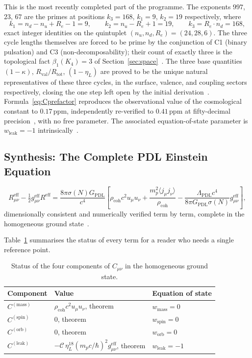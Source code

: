 \documentclass[11pt,a4paper]{article}
\newcommand{\Kfour}{K_4}
\newcommand{\Rtot}{R_{\mathrm{tot}}}
\newcommand{\Rval}{R_{\mathrm{val}}}
\newcommand{\Reb}{R_e}
\newcommand{\kap}{\kappa}
\newcommand{\etaL}{\eta_L}
\newcommand{\rhocoh}{\rho_{\mathrm{coh}}}
\newcommand{\Ccoh}{C_{\mu\nu}}
\newcommand{\Cmass}{C^{(\mathrm{mass})}}
\newcommand{\Cspin}{C^{(\mathrm{spin})}}
\newcommand{\Corb}{C^{(\mathrm{orb})}}
\newcommand{\Cleak}{C^{(\mathrm{leak})}}
\newcommand{\GPDL}{G_{\mathrm{PDL}}}
\newcommand{\LambdaPDL}{\Lambda_{\mathrm{PDL}}}
\newcommand{\geff}{g_{\mu\nu}^{\mathrm{eff}}}
\begin{document}
This is the most recently completed part of the programme. The exponents $997$, $23$, $67$ are the primes at positions $k_3=168$, $k_1=9$, $k_2=19$ respectively, where
\begin{equation}
k_1 = n_d - n_u + \Reb - 1 = 9,\qquad k_2 = n_u - \Reb + 1 = 19,\qquad k_3 = \Reb\cdot n_d = 168,
\label{eq:kindices}
\end{equation}
exact integer identities on the quintuplet $(n_u,n_d,\Reb)=(24,28,6)$. The three cycle lengths themselves are forced to be prime by the conjunction of C1 (binary pulsation) and C3 (non-decomposability); their count of exactly three is the topological fact $\beta_1(\Kfour)=3$ of Section~\ref{sec:space}~\citep{D51}. The three base quantities $(1-\kap)$, $\Rval/\Rtot$, $(1-\etaL)$ are proved to be the unique natural representatives of these three cycles, in the surface, valence, and coupling sectors respectively, closing the one step left open by the initial derivation~\citep{D52}. Formula~\eqref{eq:Cprefactor} reproduces the observational value of the cosmological constant to $0.17\,\mathrm{ppm}$, independently re-verified to $0.41\,\mathrm{ppm}$ at fifty-decimal precision~\citep{D53}, with no free parameter. The associated equation-of-state parameter is $w_{\mathrm{leak}}=-1$ intrinsically~\citep{D54}.

\subsection{Synthesis: The Complete PDL Einstein Equation}

\begin{theorembox}
\begin{equation}
R_{\mu\nu}^{\mathrm{eff}} - \tfrac12\geff R^{\mathrm{eff}} = \frac{8\pi\sigma(N)\GPDL}{c^4}\left[\rhocoh c^2 u_\mu u_\nu + \frac{m_p^2\langle j_\mu j_\nu\rangle}{\rhocoh} - \frac{\LambdaPDL c^4}{8\pi\GPDL\sigma(N)}\geff\right],
\label{eq:full}
\end{equation}
dimensionally consistent and numerically verified term by term, complete in the homogeneous ground state~\citep{D48v3,D54}.
\end{theorembox}

Table~\ref{tab:status} summarises the status of every term for a reader who needs a single reference point.

\begin{table}[h]
\centering
\caption{Status of the four components of $\Ccoh$ in the homogeneous ground state.}
\label{tab:status}
\begin{tabular}{lll}
\toprule
Component & Value & Equation of state \\
\midrule
$\Cmass$ & $\rhocoh c^2 u_\mu u_\nu$, theorem & $w_{\mathrm{mass}}=0$ \\
$\Cspin$ & $0$, theorem & $w_{\mathrm{spin}}=0$ \\
$\Corb$ & $0$, theorem & $w_{\mathrm{orb}}=0$ \\
$\Cleak$ & $-\mathcal{C}\,\etaL^{18}(m_pc/\hbar)^2\geff$, theorem & $w_{\mathrm{leak}}=-1$ \\
\bottomrule
\end{tabular}
\end{table}
\end{document}
